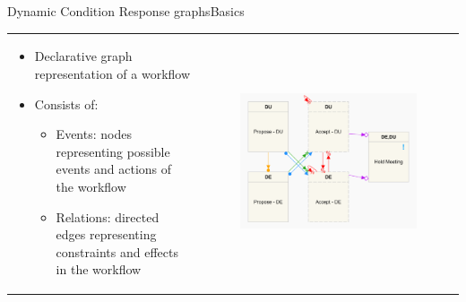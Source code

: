 \documentclass{beamer}
\begin{document}
\begin{frame}{Dynamic Condition Response graphs}{Basics}%
\begin{tabular}{lc}
  \parbox{0.5\linewidth}{\begin{itemize}
		\item Declarative graph representation of a workflow
		\item Consists of:
		\begin{itemize}
			\item Events: nodes representing possible events and actions of the workflow
			\item Relations: directed edges representing constraints and effects in the workflow
		\end{itemize}
	\end{itemize}
	}
	&
  \parbox{0.5\linewidth}{
	\begin{figure}[p]
		\includegraphics[scale=0.08]{figures/example6.png}
	\end{figure}
	}
\end{tabular}
\end{frame}
\end{document}
